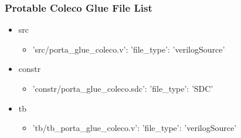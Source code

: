 \subsubsection{Protable Coleco Glue File List}
\begin{itemize}
\item src
	\begin{itemize}
	\item {'src/porta\_glue\_coleco.v': {'file\_type': 'verilogSource'}}
	\end{itemize}
\item constr
	\begin{itemize}
	\item {'constr/porta\_glue\_coleco.sdc': {'file\_type': 'SDC'}}
	\end{itemize}
\item tb
	\begin{itemize}
	\item {'tb/tb\_porta\_glue\_coleco.v': {'file\_type': 'verilogSource'}}
	\end{itemize}
\end{itemize}
